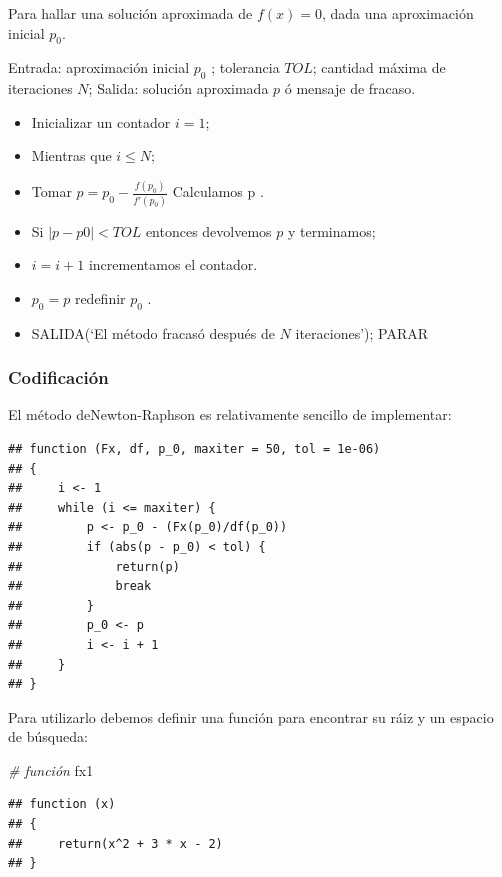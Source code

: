 \documentclass[11pt,]{article}
\newenvironment{Shaded}{\begin{snugshade}}{\end{snugshade}}
\newcommand{\CommentTok}[1]{\textcolor[rgb]{0.56,0.35,0.01}{\textit{#1}}}
\newcommand{\NormalTok}[1]{#1}
\providecommand{\tightlist}{%
\setlength{\itemsep}{0pt}\setlength{\parskip}{0pt}}
\begin{document}
Para hallar una solución aproximada de \(f(x) = 0\), dada una
aproximación inicial \(p_{0}\).

Entrada: aproximación inicial \(p_{0}\) ; tolerancia \(TOL\); cantidad
máxima de iteraciones \(N\); Salida: solución aproximada \(p\) ó mensaje
de fracaso.

\begin{itemize}
\tightlist
\item
  Inicializar un contador \(i = 1\);
\item
  Mientras que \(i \leq N\);
\item
  Tomar \(p=p_0 - \frac{f(p_{0})}{f'(p_{0})}\) Calculamos p .
\item
  Si \(|p - p0| < TOL\) entonces devolvemos \(p\) y terminamos;
\item
  \(i = i+1\) incrementamos el contador.
\item
  \(p_{0} = p\) redefinir \(p_{0}\) .
\item
  SALIDA(`El método fracasó después de \(N\) iteraciones'); PARAR
\end{itemize}

\newpage

\hypertarget{codificaciuxf3n}{%
\subsubsection{Codificación}\label{codificaciuxf3n}}

El método deNewton-Raphson es relativamente sencillo de implementar:

\begin{verbatim}
## function (Fx, df, p_0, maxiter = 50, tol = 1e-06) 
## {
##     i <- 1
##     while (i <= maxiter) {
##         p <- p_0 - (Fx(p_0)/df(p_0))
##         if (abs(p - p_0) < tol) {
##             return(p)
##             break
##         }
##         p_0 <- p
##         i <- i + 1
##     }
## }
\end{verbatim}

Para utilizarlo debemos definir una función para encontrar su ráiz y un
espacio de búsqueda:

\begin{Shaded}
\begin{Highlighting}[]
\CommentTok{# función}
\NormalTok{fx1}
\end{Highlighting}
\end{Shaded}

\begin{verbatim}
## function (x) 
## {
##     return(x^2 + 3 * x - 2)
## }
\end{verbatim}
\end{document}

